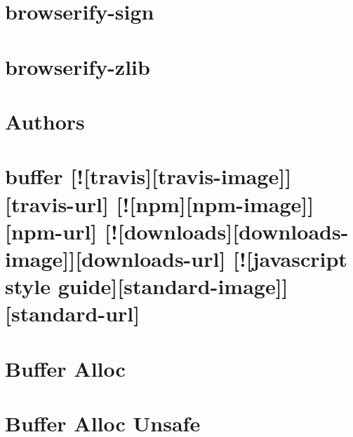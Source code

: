 \documentclass[twoside]{book}
\newcommand{\+}{\discretionary{\mbox{\scriptsize$\hookleftarrow$}}{}{}}
\begin{document}
\chapter{browserify-\/sign}
\label{md_dsmacc_examples_DRmerge_node_modules_browserify-sign_README}

\chapter{browserify-\/zlib}
\label{md_dsmacc_examples_DRmerge_node_modules_browserify-zlib_README}

\chapter{Authors}
\label{md_dsmacc_examples_DRmerge_node_modules_buffer_AUTHORS}

\chapter{buffer \mbox{[}!\mbox{[}travis\mbox{]}\mbox{[}travis-\/image\mbox{]}\mbox{]}\mbox{[}travis-\/url\mbox{]} \mbox{[}!\mbox{[}npm\mbox{]}\mbox{[}npm-\/image\mbox{]}\mbox{]}\mbox{[}npm-\/url\mbox{]} \mbox{[}!\mbox{[}downloads\mbox{]}\mbox{[}downloads-\/image\mbox{]}\mbox{]}\mbox{[}downloads-\/url\mbox{]} \mbox{[}!\mbox{[}javascript style guide\mbox{]}\mbox{[}standard-\/image\mbox{]}\mbox{]}\mbox{[}standard-\/url\mbox{]}}
\label{md_dsmacc_examples_DRmerge_node_modules_buffer_README}

\chapter{Buffer Alloc}
\label{md_dsmacc_examples_DRmerge_node_modules_buffer-alloc_readme}

\chapter{Buffer Alloc Unsafe}
\label{md_dsmacc_examples_DRmerge_node_modules_buffer-alloc-unsafe_readme}

\end{document}
